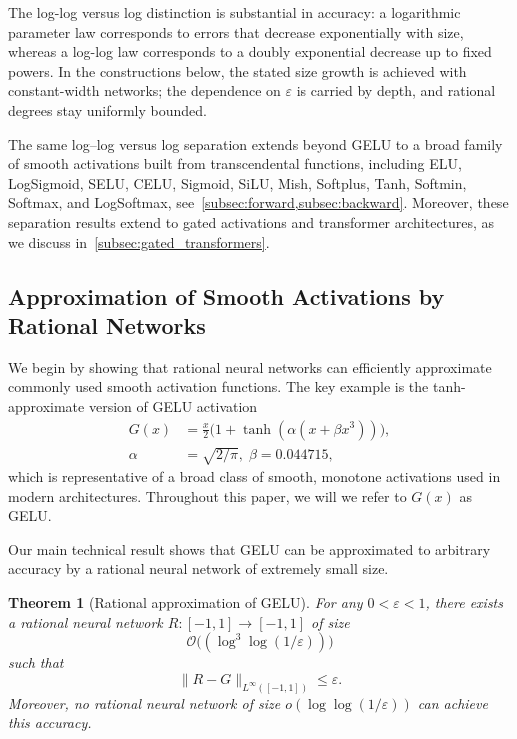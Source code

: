\documentclass{article}
\theoremstyle{plain}
\newtheorem{theorem}{Theorem}[section]
\theoremstyle{definition}
\theoremstyle{remark}
\begin{document}
 {The log-log versus log distinction is substantial in accuracy: a logarithmic parameter law corresponds to errors that decrease exponentially with size, whereas a log-log law corresponds to a doubly exponential decrease up to fixed powers. In the constructions below, the stated size growth is achieved with constant-width networks; the dependence on $\varepsilon$ is carried by depth, and rational degrees stay uniformly bounded.}

The same log--log versus log separation extends beyond GELU to a broad family of smooth activations built from transcendental functions, including ELU, LogSigmoid, SELU, CELU, Sigmoid, SiLU, Mish, Softplus, Tanh, Softmin, Softmax, and LogSoftmax, see~\cref{subsec:forward,subsec:backward}.
Moreover, these separation results extend to gated activations and transformer architectures, as we discuss in~\cref{subsec:gated_transformers}.


\subsection{Approximation of Smooth Activations by Rational Networks}
\label{subsec:forward}

We begin by showing that rational neural networks can efficiently approximate commonly used smooth activation functions.  
The key example is the tanh-approximate version of GELU activation
\begin{align*}
    G(x) &=\frac{x}{2}\bigl(1+\tanh(\alpha(x+\beta x^3))\bigr), \\
    \alpha&=\sqrt{2/\pi},\;\beta=0.044715,
\end{align*}
which is representative of a broad class of smooth, monotone activations used in modern architectures.  {Throughout this paper, we will we refer to $G(x)$ as GELU.} 

Our main technical result shows that GELU can be approximated to arbitrary accuracy by a rational neural network of extremely small size.

\begin{theorem}[Rational approximation of GELU]
\label{thm:gelu_to_rational}
For any $0<\varepsilon<1$, there exists a rational neural network $R:[-1,1]\to[-1,1]$ of size
\[
\mathcal{O}\bigl((\log^3\log(1/\varepsilon))\bigr)
\]
such that
\[
\|R-G\|_{L^\infty([-1,1])}\le \varepsilon.
\]
Moreover, no rational neural network of size $o(\log\log(1/\varepsilon))$ can achieve this accuracy.
\end{theorem}
\end{document}
